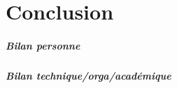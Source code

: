 \chapter*{Conclusion}
\label{chap:Conclusion}

\paragraph{Bilan personne}
\paragraph{Bilan technique/orga/académique}
